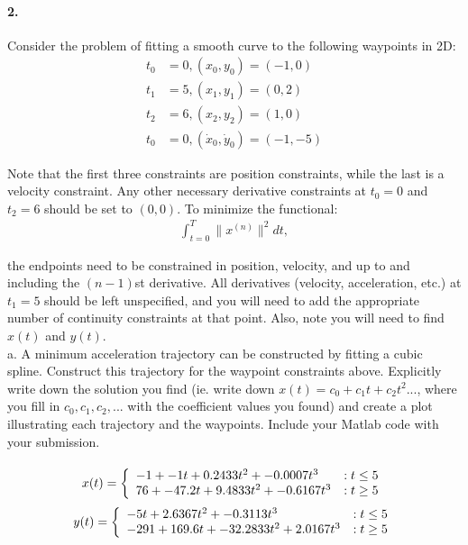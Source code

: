 \documentclass[english]{article}
\begin{document}
\paragraph{2.}  
Consider the problem of fitting a smooth curve to the following waypoints in 2D: 
\begin{align*}
t_0 &= 0, (x_0, y_0) = (-1, 0) \\
t_1 &= 5, (x_1, y_1) = (0, 2) \\
t_2 &= 6, (x_2, y_2) = (1, 0) \\
t_0 &= 0, (\dot{x}_0, \dot{y}_0) = (-1, -5) 
\end{align*}

Note that the first three constraints are position constraints, while the last is a velocity constraint. Any other necessary derivative constraints at $t_0 = 0$ and $t_2 = 6$ should be set to $(0, 0)$. To minimize the functional:
\begin{align}
\int_{t = 0}^T \| x^{(n)} \|^2 dt,
\end{align}

\noindent the endpoints need to be constrained in position, velocity, and up to and including the $(n-1)$st derivative. All derivatives (velocity, acceleration, etc.) at $t_1 = 5$ should be left unspecified, and you will need to add the appropriate number of continuity constraints at that point. Also, note you will need to find $x(t)$ and $y(t)$.
\\
a. A minimum acceleration trajectory can be constructed by fitting a cubic spline. Construct this trajectory for the waypoint constraints above. Explicitly write down the solution you find (ie. write down $x(t) = c_0 + c_1 t + c_2 t^2 ...$, where you fill in $c_0, c_1, c_2, ...$ with the coefficient values you found) and create a plot illustrating each trajectory and the waypoints. Include your Matlab code with your submission. 
\paragraph{}
 \begin{displaymath}
   x(t) = \left\{
     \begin{array}{lr}
       $$-1 + -1t + 0.2433 t^2+ -0.0007 t^3 $$& : t \leq 5\\
       $$76+  -47.2t+   9.4833t^2 + -0.6167t^3$$ & : t \geq 5
     \end{array}
   \right.
\end{displaymath} 
\begin{displaymath}
   y(t) = \left\{
     \begin{array}{lr}
       $$ -5t +  2.6367t^2 +   -0.3113t^3 $$& : t \leq 5\\
       $$ -291 +  169.6t +  -32.2833t^2 + 2.0167t^3$$ & : t \geq 5
     \end{array}
   \right.
\end{displaymath} 
\end{document}
